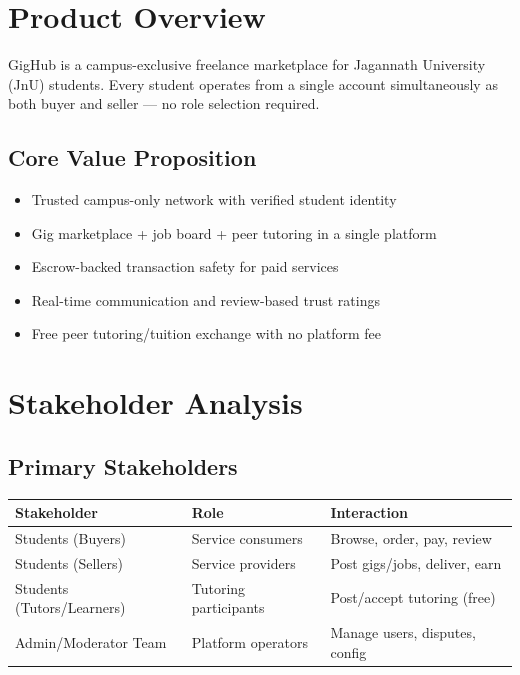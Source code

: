\documentclass[a4paper,12pt]{article}
\begin{document}
\section{Product Overview}

GigHub is a campus-exclusive freelance marketplace for Jagannath University (JnU) students. Every student operates from a single account simultaneously as both buyer and seller --- no role selection required.

\subsection{Core Value Proposition}
\begin{itemize}
    \item Trusted campus-only network with verified student identity
    \item Gig marketplace + job board + peer tutoring in a single platform
    \item Escrow-backed transaction safety for paid services
    \item Real-time communication and review-based trust ratings
    \item Free peer tutoring/tuition exchange with no platform fee
\end{itemize}

\section{Stakeholder Analysis}

\subsection{Primary Stakeholders}

\begin{table}[H]
\centering
\begin{tabular}{|l|l|l|}
\hline
\textbf{Stakeholder} & \textbf{Role} & \textbf{Interaction} \\
\hline
Students (Buyers) & Service consumers & Browse, order, pay, review \\
Students (Sellers) & Service providers & Post gigs/jobs, deliver, earn \\
Students (Tutors/Learners) & Tutoring participants & Post/accept tutoring (free) \\
Admin/Moderator Team & Platform operators & Manage users, disputes, config \\
\hline
\end{tabular}
\end{table}
\end{document}
